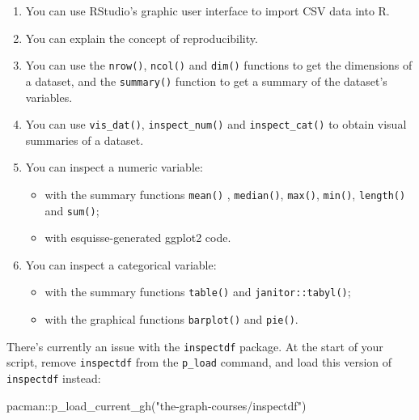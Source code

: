 \documentclass[
  letterpaper,
  DIV=11,
  numbers=noendperiod]{scrreprt}
\newenvironment{Shaded}{\begin{snugshade}}{\end{snugshade}}
\newcommand{\FunctionTok}[1]{\textcolor[rgb]{0.28,0.35,0.67}{#1}}
\newcommand{\NormalTok}[1]{\textcolor[rgb]{0.00,0.23,0.31}{#1}}
\newcommand{\SpecialCharTok}[1]{\textcolor[rgb]{0.37,0.37,0.37}{#1}}
\newcommand{\StringTok}[1]{\textcolor[rgb]{0.13,0.47,0.30}{#1}}
\begin{document}
\begin{enumerate}
\def\labelenumi{\arabic{enumi}.}
\item
  You can use RStudio's graphic user interface to import CSV data into
  R.
\item
  You can explain the concept of reproducibility.
\item
  You can use the \texttt{nrow()}, \texttt{ncol()} and \texttt{dim()}
  functions to get the dimensions of a dataset, and the
  \texttt{summary()} function to get a summary of the dataset's
  variables.
\item
  You can use \texttt{vis\_dat()}, \texttt{inspect\_num()} and
  \texttt{inspect\_cat()} to obtain visual summaries of a dataset.
\item
  You can inspect a numeric variable:

  \begin{itemize}
  \item
    with the summary functions \texttt{mean()} , \texttt{median()},
    \texttt{max()}, \texttt{min()}, \texttt{length()} and
    \texttt{sum()};
  \item
    with esquisse-generated ggplot2 code.
  \end{itemize}
\item
  You can inspect a categorical variable:

  \begin{itemize}
  \item
    with the summary functions \texttt{table()} and
    \texttt{janitor::tabyl()};
  \item
    with the graphical functions \texttt{barplot()} and \texttt{pie()}.
  \end{itemize}
\end{enumerate}

\begin{tcolorbox}[enhanced jigsaw, title=\textcolor{quarto-callout-warning-color}{\faExclamationTriangle}\hspace{0.5em}{⚠️ NOTICE ⚠️}, colbacktitle=quarto-callout-warning-color!10!white, leftrule=.75mm, arc=.35mm, opacityback=0, bottomrule=.15mm, rightrule=.15mm, toptitle=1mm, breakable, toprule=.15mm, colback=white, coltitle=black, colframe=quarto-callout-warning-color-frame, bottomtitle=1mm, titlerule=0mm, left=2mm, opacitybacktitle=0.6]

There's currently an issue with the \texttt{inspectdf} package. At the
start of your script, remove \texttt{inspectdf} from the
\texttt{p\_load} command, and load this version of \texttt{inspectdf}
instead:

\begin{Shaded}
\begin{Highlighting}[]
\NormalTok{pacman}\SpecialCharTok{::}\FunctionTok{p\_load\_current\_gh}\NormalTok{(}\StringTok{"the{-}graph{-}courses/inspectdf"}\NormalTok{)}
\end{Highlighting}
\end{Shaded}

\end{tcolorbox}
\end{document}
